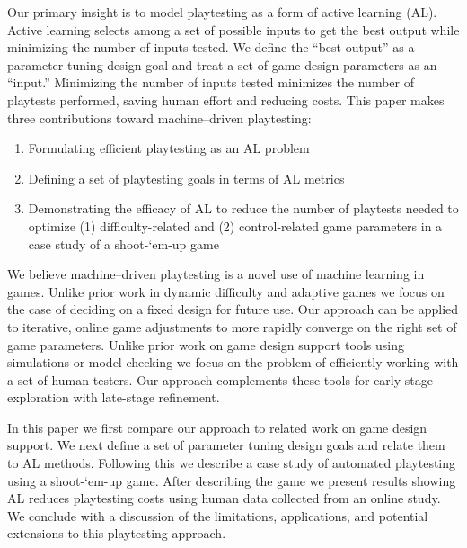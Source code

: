 \documentclass{sig-alternate}
\begin{document}
Our primary insight is to model playtesting as a form of active learning (AL).
Active learning \cite{settles2012:al-book} selects among a set of possible inputs to get the best output while minimizing the number of inputs tested.
We define the ``best output'' as a parameter tuning design goal and treat a set of game design parameters as an ``input.''
Minimizing the number of inputs tested minimizes the number of playtests performed, saving human effort and reducing costs.
This paper makes three contributions toward machine--driven playtesting:
\begin{enumerate}
\item Formulating efficient playtesting as an AL problem
\item Defining a set of playtesting goals in terms of AL metrics
\item Demonstrating the efficacy of AL to reduce the number of playtests needed to optimize (1) difficulty-related and (2) control-related game parameters in a case study of a shoot-`em-up game
\end{enumerate}

We believe machine--driven playtesting is a novel use of machine learning in games.
Unlike prior work in dynamic difficulty and adaptive games we focus on the case of deciding on a fixed design for future use.
Our approach can be applied to iterative, online game adjustments to more rapidly converge on the right set of game parameters.
Unlike prior work on game design support tools using simulations or model-checking we focus on the problem of efficiently working with a set of human testers.
Our approach complements these tools for early-stage exploration with late-stage refinement.

In this paper we first compare our approach to related work on game design support.
We next define a set of parameter tuning design goals and relate them to AL methods.
Following this we describe a case study of automated playtesting using a shoot-`em-up game.
After describing the game we present results showing AL reduces playtesting costs using human data collected from an online study.
We conclude with a discussion of the limitations, applications, and potential extensions to this playtesting approach.
\end{document}
